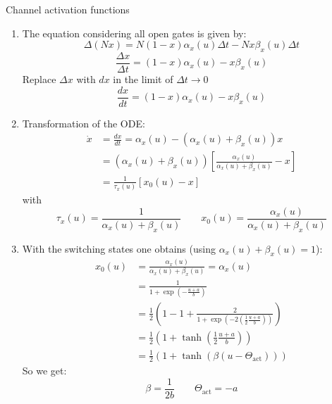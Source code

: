 \documentclass[12pt]{article}
\newenvironment{exercise}[2][Exercise]{\begin{trivlist}
\item[\hskip \labelsep {\bfseries #1}\hskip \labelsep {\bfseries #2.}]}{\end{trivlist}}
\begin{document}
\begin{exercise}{2.2}
Channel activation functions \\
\renewcommand{\labelenumi}{\alph{enumi})}
\begin{enumerate}
\item The equation considering all open gates is given by:
	\begin{equation}
		\Delta (Nx) = N(1-x) \alpha_x(u)\Delta t -Nx\beta_x(u)\Delta t
	\end{equation}
		\begin{equation}
		\frac{\Delta x}{\Delta t} = (1-x) \alpha_x(u) - x\beta_x(u)
	\end{equation}
	Replace $\Delta x$ with $dx$ in the limit of $\Delta t \rightarrow 0$
	\begin{equation}
		\frac{dx}{dt} = (1-x) \alpha_x(u) - x\beta_x(u)
	\end{equation}
\item Transformation of the ODE:
	\begin{align}
		\dot{x} 	&= \frac{dx}{dt} = \alpha_x(u) - \left(\alpha_x(u) + \beta_x(u)\right)x \\
					&= \left( \alpha_x(u) + \beta_x(u)\right)\left[\frac{\alpha_x(u)}{\alpha_x(u) + \beta_x(u)} - x\right] \\
					&= \frac{1}{\tau_x(u)}[x_0(u)-x]
	\end{align}
	with
	\begin{equation}
		\tau_x(u) = \frac{1}{\alpha_x(u) + \beta_x(u)} \qquad x_0(u) = \frac{\alpha_x(u)}{\alpha_x(u) + \beta_x(u)}
	\end{equation}
\item With the switching states one obtains (using $\alpha_x(u) + \beta_x(u) = 1$):
  \begin{align}
    x_0(u)  &= \frac{\alpha_x(u)}{\alpha_x(u) + \beta_x(u)} = \alpha_x(u) \\
            &= \frac{1}{1+\exp{(-\frac{u+a}{b})}} \\
            &= \frac{1}{2}\left(1-1+\frac{2}{1+\exp{\left(-2\left(\frac{1}{2}\frac{u+a}{b}\right)\right)}}\right) \\
            &= \frac{1}{2}\left(1+\tanh{\left(\frac{1}{2}\frac{u+a}{b}\right)}\right) \\
            &= \frac{1}{2}\left(1+\tanh{\left(\beta(u-\Theta_{\text{act}})\right)}\right)
  \end{align}
  So we get:
  \begin{equation}
    \beta = \frac{1}{2b} \qquad \Theta_{\text{act}} = -a
  \end{equation}
\end{enumerate}

\end{exercise}
 
\end{document}
